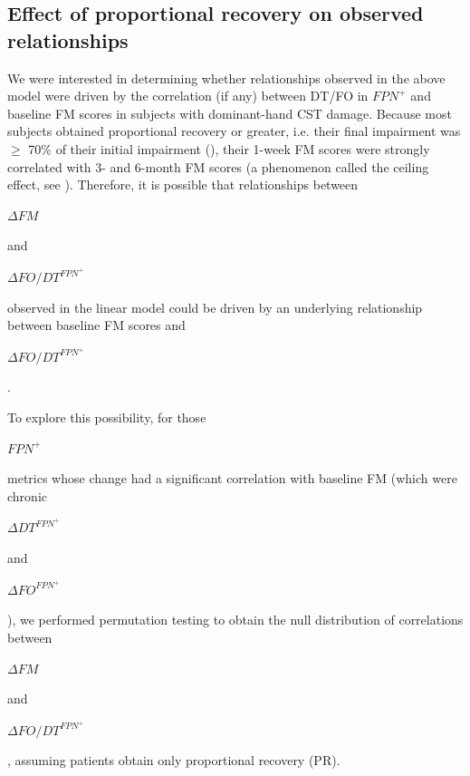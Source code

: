 \documentclass[phd,tocprelim]{cornell}
\begin{document}
	\subsection{Effect of proportional recovery on observed relationships}
    We were interested in determining whether relationships observed in the above model were driven by the correlation (if any) between DT/FO in $FPN^+$ and baseline FM scores in subjects with dominant-hand CST damage. Because most subjects obtained proportional recovery or greater, i.e. their final impairment was $\ge$ 70$\%$ of their initial impairment (\cite{Kundert2019-ou}), their 1-week FM scores were strongly correlated with 3- and 6-month FM scores (a phenomenon called the ceiling effect, see \cite{Hope2019-da}). Therefore, it is possible that  relationships between  \begin{Large}$\Delta FM$\end{Large}  and  \begin{Large}$\Delta FO/DT^{FPN^+}$\end{Large}  observed in the linear model could be driven by an underlying relationship between baseline FM scores and  \begin{large}$\Delta FO/DT^{FPN^+}$\end{large} . 
    
    To explore this possibility, for those  \begin{Large}$FPN^+$\end{Large}  metrics whose change had a significant correlation with baseline FM (which were chronic \begin{Large}$\Delta DT^{FPN^+}$\end{Large}  and  \begin{Large}$\Delta FO^{FPN^+}$\end{Large}), we performed permutation testing to obtain the null distribution of correlations between  \begin{Large}$\Delta FM$\end{Large}  and  \begin{Large}$\Delta FO/DT^{FPN^+}$\end{Large} , assuming patients obtain only proportional recovery (PR). 
    
\end{document}
